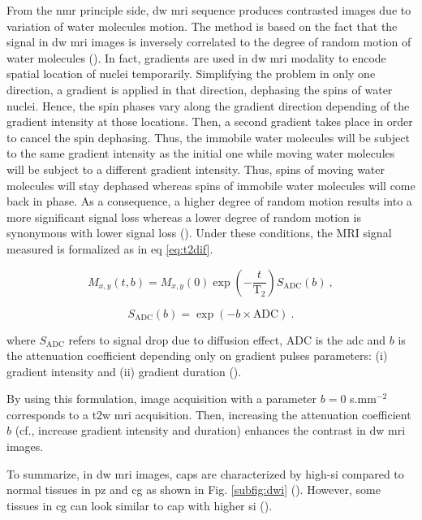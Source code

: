 \begin{enumerate}[leftmargin=*]
From the \ac{nmr} principle side, \ac{dw} \ac{mri} sequence produces contrasted images due to variation of water molecules motion. The method is based on the fact that the signal in \ac{dw} \ac{mri} images is inversely correlated to the degree of random motion of water molecules (\cite{Huisman2003}). In fact, gradients are used in \ac{dw} \ac{mri} modality to encode spatial location of nuclei temporarily. Simplifying the problem in only one direction, a gradient is applied in that direction, dephasing the spins of water nuclei. Hence, the spin phases vary along the gradient direction depending of the gradient intensity at those locations. Then, a second gradient takes place in order to cancel the spin dephasing. Thus, the immobile water molecules will be subject to the same gradient intensity as the initial one while moving water molecules will be subject to a different gradient intensity. Thus, spins of moving water molecules will stay dephased whereas spins of immobile water molecules will come back in phase. As a consequence, a higher degree of random motion results into a more significant signal loss whereas a lower degree of random motion is synonymous with lower signal loss (\cite{Huisman2003}). Under these conditions, the MRI signal measured is formalized as in \acs{eq} \ref{eq:t2dif}.

\begin{equation}
	M_{x,y}\left(t,b\right) = M_{x,y}(0) \exp \left( - \frac{t}{\text{T}_2} \right) S_{\text{ADC}}(b) \ , 
	\label{eq:t2dif}
\end{equation}

\begin{equation}
	S_{\text{ADC}}(b) = \exp \left( -b \times \text{ADC} \right) \ . 
	\label{eq:dif}
\end{equation}

\noindent where $S_{\text{ADC}}$ refers to signal drop due to diffusion effect, $\text{ADC}$ is the \acl{adc} and $b$ is the attenuation coefficient depending only on gradient pulses parameters: (i) gradient intensity and (ii) gradient duration (\cite{LeBihan1986}).

By using this formulation, image acquisition with a parameter $b=0$ s.mm$^{-2}$ corresponds to a \ac{t2w} \ac{mri} acquisition. Then, increasing the attenuation coefficient $b$ (cf., increase gradient intensity and duration) enhances the contrast in \ac{dw} \ac{mri} images.

To summarize, in \ac{dw} \ac{mri} images, \acp{cap} are characterized by high-\ac{si} compared to normal tissues in \ac{pz} and \ac{cg} as shown in Fig. \ref{subfig:dwi} (\cite{Barentsz2012}). However, some tissues in \ac{cg} can look similar to \ac{cap} with higher \ac{si} (\cite{Barentsz2012}).


\end{enumerate}
